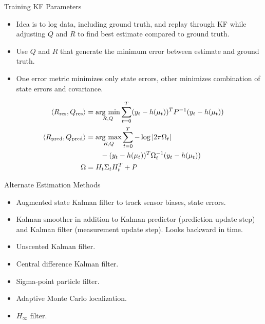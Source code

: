 \documentclass[hyperref={pdfpagelabels=false}]{beamer}
\begin{document}
\begin{frame}{Training KF Parameters}
\begin{itemize}
\item Idea is to log data, including ground truth, and replay through KF while adjusting $Q$ and $R$ to find best estimate compared to ground truth.
\item Use $Q$ and $R$ that generate the minimum error between estimate and ground truth.
\item One error metric minimizes only state errors, other minimizes combination of state errors and covariance.
\end{itemize}
\begin{align*}
\left<R_{\text{res}},Q_{\text{res}}\right> &= \mathop{\arg\,\min}\limits_{R,Q}\sum_{t=0}^T (y_t-h(\mu_t))^TP^{-1}(y_t-h(\mu_t)) \\
\left<R_{\text{pred}},Q_{\text{pred}}\right> &= \mathop{\arg\,\max}\limits_{R,Q}\sum_{t=0}^T -\log|2\pi\Omega_t| \\
&\qquad - (y_t-h(\mu_t))^T\Omega_t^{-1}(y_t-h(\mu_t)) \\
\Omega &= H_t\Sigma_tH_t^T+P
\end{align*}
\end{frame}

\begin{frame}{Alternate Estimation Methods}
\begin{itemize}
\item Augmented state Kalman filter to track sensor biases, state errors.
\item Kalman smoother in addition to Kalman predictor (prediction update step) and Kalman filter (measurement update step). Looks backward in time.
\item Unscented Kalman filter.
\item Central difference Kalman filter.
\item Sigma-point particle filter.
\item Adaptive Monte Carlo localization.
\item $H_\infty$ filter.
\end{itemize}
\end{frame}
\end{document}
